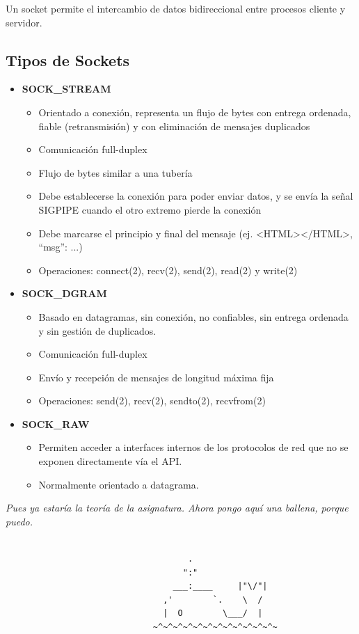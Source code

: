 Un socket permite el intercambio de datos bidireccional entre procesos cliente y servidor.
\subsection{Tipos de Sockets}
\begin{itemize}
    \item \textbf{SOCK\_STREAM}
    \begin{itemize}
        \item Orientado a conexión, representa un flujo de bytes con entrega ordenada, fiable (retransmisión) y con eliminación de mensajes duplicados
        \item Comunicación full-duplex
        \item Flujo de bytes similar a una tubería
        \item Debe establecerse la conexión para poder enviar datos, y se envía la señal SIGPIPE cuando el otro extremo pierde la conexión
        \item Debe marcarse el principio y final del mensaje (ej. <HTML></HTML>, { “msg”: {...}})
        \item Operaciones: connect(2), recv(2), send(2), read(2) y write(2)
    \end{itemize}
    
    \item \textbf{SOCK\_DGRAM}
    \begin{itemize}
        \item Basado en datagramas, sin conexión, no confiables, sin entrega ordenada y sin gestión de duplicados.
        \item Comunicación full-duplex
        \item Envío y recepción de mensajes de longitud máxima fija
        \item Operaciones: send(2), recv(2), sendto(2), recvfrom(2)
    \end{itemize}
    
    \item \textbf{SOCK\_RAW}
    \begin{itemize}
        \item Permiten acceder a interfaces internos de los protocolos de red que no se exponen directamente vía el API.
        \item Normalmente orientado a datagrama.
    \end{itemize}
\end{itemize}
\textit{Pues ya estaría la teoría de la asignatura. Ahora pongo aquí una ballena, porque puedo.}
\begin{figure}[H]
\begin{verbatim}
    
                               .
                              ":"
                            ___:____     |"\/"|
                          ,'        `.    \  /
                          |  O        \___/  |
                        ~^~^~^~^~^~^~^~^~^~^~^~^~
\end{verbatim}
\end{figure}